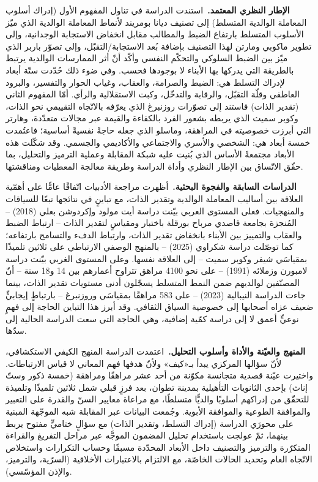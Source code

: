 \medskip
\noindent\textbf{الإطار النظري المعتمد.}\ استندت الدراسة في تناول المفهوم الأول (إدراك أسلوب
المعاملة الوالدية المتسلط) إلى تصنيف ديانا بومريند لأنماط المعاملة الوالدية الذي ميّز الأسلوب
المتسلط بارتفاع الضبط والمطالب مقابل انخفاض الاستجابة الوجدانية، وإلى تطوير ماكوبي ومارتن لهذا
التصنيف بإضافة بُعد الاستجابة/التقبّل، وإلى تصوّر باربر الذي ميّز بين الضبط السلوكي والتحكّم
النفسي وأكّد أنّ أثر الممارسات الوالدية يرتبط بالطريقة التي يدركها بها الأبناء لا بوجودها فحسب.
وفي ضوء ذلك حُدّدت ستّة أبعاد لإدراك التسلط هي: الضبط والصرامة، والعقاب، وغياب الحوار والتفسير،
والبرود العاطفي وقلّة التقبّل، والرقابة والتدخّل، وكبت الاستقلالية والرأي. أمّا المفهوم الثاني
(تقدير الذات) فاستند إلى تصوّرات روزنبرغ الذي يعرّفه بالاتّجاه التقييمي نحو الذات، وكوبر سميث الذي
يربطه بشعور الفرد بالكفاءة والقيمة عبر مجالات متعدّدة، وهارتر التي أبرزت خصوصيته في المراهقة،
وماسلو الذي جعله حاجةً نفسيةً أساسية؛ فاعتُمدت خمسة أبعاد هي: الشخصي والأسري والاجتماعي والأكاديمي
والجسمي. وقد شكّلت هذه الأبعاد مجتمعةً الأساس الذي بُنيت عليه شبكة المقابلة وعملية الترميز
والتحليل، بما حقّق الاتّساق بين الإطار النظري وأداة الدراسة وطريقة معالجة المعطيات ومناقشتها.

\medskip
\noindent\textbf{الدراسات السابقة والفجوة البحثية.}\ أظهرت مراجعة الأدبيات اتّفاقًا عامًّا على
أهمّية العلاقة بين أساليب المعاملة الوالدية وتقدير الذات، مع تباينٍ في نتائجها تبعًا للسياقات
والمنهجيات. فعلى المستوى العربي بيّنت دراسة أيت مولود وإكردوشن بعلي (2018) -- المُنجزة بجامعة
قاصدي مرباح بورقلة باختبار  ومقياسٍ لتقدير الذات -- ارتباط الضبط والعقاب والتمييز بين
الأبناء بانخفاض تقدير الذات، وارتباط الدفء والتسامح بارتفاعه؛ كما توصّلت دراسة شكراوي (2025) --
بالمنهج الوصفي الارتباطي على ثلاثين تلميذًا بمقياسَي شيفر وكوبر سميث -- إلى العلاقة نفسها. وعلى
المستوى الغربي بيّنت دراسة لامبورن وزملائه (1991) -- على نحو 4100 مراهق تتراوح أعمارهم بين 14
و18 سنة -- أنّ المصنّفين لوالديهم ضمن النمط المتسلط يسجّلون أدنى مستويات تقدير الذات، بينما جاءت
الدراسة النيبالية (2023) -- على 583 مراهقًا بمقياسَي  وروزنبرغ -- بارتباطٍ إيجابيٍّ ضعيف
عزاه أصحابها إلى خصوصية السياق الثقافي. وقد أبرز هذا التباين الحاجة إلى فهمٍ نوعيٍّ أعمق لا إلى
دراسة كمّية إضافية، وهي الحاجة التي سعت الدراسة الحالية إلى سدّها.

\medskip
\noindent\textbf{المنهج والعيّنة والأداة وأسلوب التحليل.}\ اعتمدت الدراسة المنهج الكيفي
الاستكشافي، لأنّ سؤالها المركزي يبدأ بـ«كيف» ولأنّ هدفها فهم المعاني لا قياس الارتباطات. واختيرت
عيّنة قصدية متجانسة مكوّنة من أحد عشر مراهقًا ومراهقة (خمسة ذكور وستّ إناث) بإحدى الثانويات
التأهيلية بمدينة تطوان، بعد فرزٍ قبلي شمل ثلاثين تلميذًا وتلميذة للتحقّق من إدراكهم أسلوبًا
والديًّا متسلطًا، مع مراعاة معايير السنّ والقدرة على التعبير والموافقة الطوعية والموافقة الأبوية.
وجُمعت البيانات عبر المقابلة شبه الموجّهة المبنية على محورَي الدراسة (إدراك التسلط، وتقدير الذات)
مع سؤالٍ ختاميٍّ مفتوح يربط بينهما، ثمّ عولجت باستخدام تحليل المضمون الموجَّه عبر مراحل التفريغ
والقراءة المتكرّرة والترميز والتصنيف داخل الأبعاد المحدّدة مسبقًا وحساب التكرارات واستخلاص
الاتّجاه العام وتحديد الحالات الخاصّة، مع الالتزام بالاعتبارات الأخلاقية (السرّية، والترميز،
والإذن المؤسّسي).

